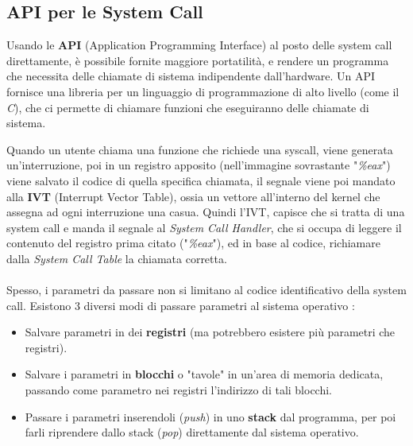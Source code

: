 \documentclass[12pt, letterpaper]{article}
\begin{document}
\subsection{API per le System Call}
Usando le \textbf{API} (Application Programming Interface) al posto delle system call direttamente, è possibile 
fornite maggiore portatilità, e rendere un programma che necessita delle chiamate di sistema indipendente 
dall'hardware. Un API fornisce una libreria per un linguaggio di programmazione di alto livello (come il \textit{C}), 
che ci permette di chiamare funzioni che eseguiranno delle chiamate di sistema.
\begin{figure}[h]
\end{figure}
\newpage
Quando un utente chiama una funzione che richiede una syscall, viene generata un'interruzione, poi in un registro apposito 
(nell'immagine sovrastante "\textit{\%eax}") viene salvato il codice di quella specifica chiamata,
il segnale viene poi mandato alla \textbf{IVT} (Interrupt Vector Table), ossia un vettore all'interno 
del kernel che assegna ad ogni interruzione una casua. Quindi l'IVT, capisce che si tratta di una system call 
e manda il segnale al \textit{System Call Handler}, che si occupa di leggere il contenuto del registro 
prima citato ("\textit{\%eax}"), ed in base al codice, richiamare dalla \textit{System Call Table} la chiamata 
corretta.\\\hphantom{.}\\
Spesso, i parametri da passare non si limitano al codice identificativo della system call. Esistono 3 
diversi modi di passare parametri al sistema operativo :
\begin{itemize}
    \item Salvare parametri in dei \textbf{registri} (ma potrebbero esistere più parametri che registri).
    \item Salvare i parametri in \textbf{blocchi} o "tavole" in un'area di memoria dedicata, passando come 
    parametro nei registri l'indirizzo di tali blocchi.
    \item Passare i parametri inserendoli (\textit{push}) in uno \textbf{stack} dal programma, per poi farli 
    riprendere dallo stack (\textit{pop}) direttamente dal sistema operativo.
\end{itemize}
\end{document}
